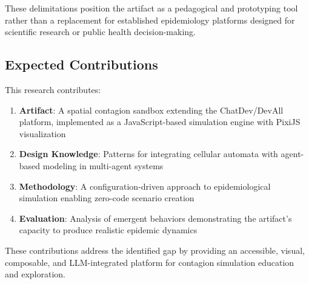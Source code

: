 These delimitations position the artifact as a pedagogical and prototyping tool rather than a replacement for established epidemiology platforms designed for scientific research or public health decision-making.

\subsection{Expected Contributions}

This research contributes:

\begin{enumerate}
    \item \textbf{Artifact}: A spatial contagion sandbox extending the ChatDev/DevAll platform, implemented as a JavaScript-based simulation engine with PixiJS visualization
    \item \textbf{Design Knowledge}: Patterns for integrating cellular automata with agent-based modeling in multi-agent systems
    \item \textbf{Methodology}: A configuration-driven approach to epidemiological simulation enabling zero-code scenario creation
    \item \textbf{Evaluation}: Analysis of emergent behaviors demonstrating the artifact's capacity to produce realistic epidemic dynamics
\end{enumerate}

These contributions address the identified gap by providing an accessible, visual, composable, and LLM-integrated platform for contagion simulation education and exploration.
